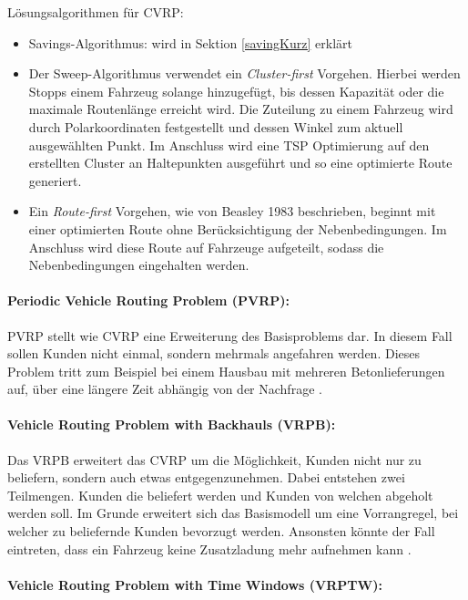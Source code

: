 \noindent
Lösungsalgorithmen für CVRP:
\begin{itemize}
	\item Savings-Algorithmus: wird in Sektion \ref{savingKurz} erklärt 
	\item Der Sweep-Algorithmus verwendet ein \textit{Cluster-first} Vorgehen. 
	Hierbei werden Stopps einem Fahrzeug solange hinzugefügt, bis dessen Kapazität oder die maximale Routenlänge erreicht wird. 
	Die Zuteilung zu einem Fahrzeug wird durch Polarkoordinaten festgestellt und dessen Winkel zum aktuell ausgewählten Punkt. 
	Im Anschluss wird eine TSP Optimierung auf den erstellten Cluster an Haltepunkten ausgeführt und so eine optimierte Route generiert. 
	\item Ein \textit{Route-first} Vorgehen, wie von Beasley 1983 beschrieben, beginnt mit einer optimierten Route ohne Berücksichtigung der Nebenbedingungen. 
	Im Anschluss wird diese Route auf Fahrzeuge aufgeteilt, sodass die Nebenbedingungen eingehalten werden. 
\end{itemize} 

\paragraph{Periodic Vehicle Routing Problem (PVRP):}

PVRP stellt wie CVRP eine Erweiterung des Basisproblems dar. 
In diesem Fall sollen Kunden nicht einmal, sondern mehrmals angefahren werden. 
Dieses Problem tritt zum Beispiel bei einem Hausbau mit mehreren Betonlieferungen auf, über eine längere Zeit abhängig von der Nachfrage \cite{laporte1992vehicle}. 

\paragraph{Vehicle Routing Problem with Backhauls (VRPB):}

Das VRPB erweitert das CVRP um die Möglichkeit, Kunden nicht nur zu beliefern, sondern auch etwas entgegenzunehmen. 
Dabei entstehen zwei Teilmengen.
Kunden die beliefert werden und Kunden von welchen abgeholt werden soll. 
Im Grunde erweitert sich das Basismodell um eine Vorrangregel, bei welcher zu beliefernde Kunden bevorzugt werden. 
Ansonsten könnte der Fall eintreten, dass ein Fahrzeug keine Zusatzladung mehr aufnehmen kann \cite{wurzer2010fallbeispiele}.

\paragraph{Vehicle Routing Problem with Time Windows (VRPTW):}

